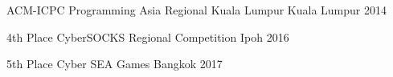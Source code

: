 



\begin{cvhonors}

  \cvhonor
    {}
    {ACM-ICPC Programming Asia Regional Kuala Lumpur} %
    {Kuala Lumpur} %
    {2014} %

  \cvhonor
    {4th Place} %
    {CyberSOCKS Regional Competition} %
    {Ipoh} %
    {2016} %

  \cvhonor
    {5th Place} %
    {Cyber SEA Games} %
    {Bangkok} %
    {2017} %

\end{cvhonors}




